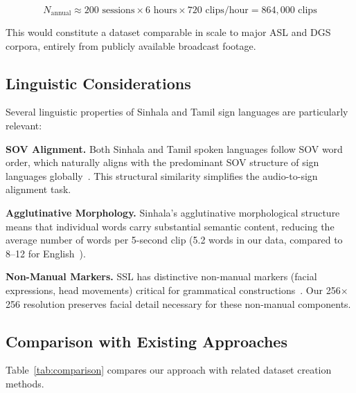 \documentclass[journal]{IEEEtran}
\begin{document}
\begin{equation}
N_{\text{annual}} \approx 200 \text{ sessions} \times 6 \text{ hours} \times 720 \text{ clips/hour} = 864{,}000 \text{ clips}
\end{equation}

This would constitute a dataset comparable in scale to major ASL and DGS corpora, entirely from publicly available broadcast footage.

\subsection{Linguistic Considerations}

Several linguistic properties of Sinhala and Tamil sign languages are particularly relevant:

\textbf{SOV Alignment.} Both Sinhala and Tamil spoken languages follow SOV word order, which naturally aligns with the predominant SOV structure of sign languages globally~\cite{pfau2012sign}. This structural similarity simplifies the audio-to-sign alignment task.

\textbf{Agglutinative Morphology.} Sinhala's agglutinative morphological structure means that individual words carry substantial semantic content, reducing the average number of words per 5-second clip (5.2 words in our data, compared to 8--12 for English~\cite{duarte2021how2sign}).

\textbf{Non-Manual Markers.} SSL has distinctive non-manual markers (facial expressions, head movements) critical for grammatical constructions~\cite{herath2019sinhala}. Our 256$\times$256 resolution preserves facial detail necessary for these non-manual components.

\subsection{Comparison with Existing Approaches}

Table~\ref{tab:comparison} compares our approach with related dataset creation methods.
\end{document}
